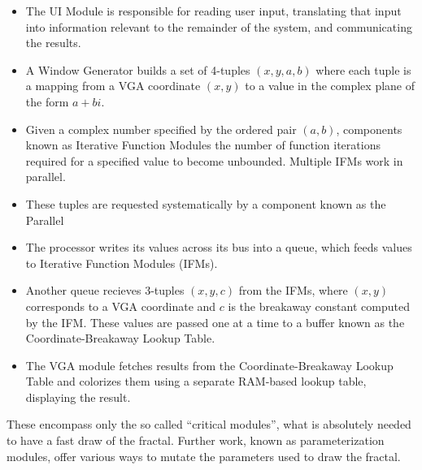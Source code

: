 \documentclass{article}
\begin{document}
\begin{itemize}
\item The UI Module is responsible for reading user input, translating that input
into information relevant to the remainder of the system, and communicating the results.
\item A Window Generator builds a set of 4-tuples $(x, y, a, b)$ where
  each tuple is a mapping from a VGA coordinate $(x, y)$ to a value in
  the complex plane of the form $a+bi$. 
\item Given a complex number specified by the ordered pair $(a, b)$, components known as
Iterative Function Modules
 the number of function iterations required for
  a specified value to become unbounded. Multiple IFMs work in
  parallel.

\item These tuples are requested systematically by a component known as the Parallel


\item The processor writes its values across its bus into a queue,
  which feeds values to Iterative Function Modules (IFMs).

\item Another queue recieves 3-tuples $(x, y, c)$ from the IFMs, where
  $(x, y)$ corresponds to a VGA coordinate and $c$ is the breakaway
  constant computed by the IFM. These values are passed one at a time
  to a buffer known as the Coordinate-Breakaway Lookup Table.
\item The VGA module fetches results from the Coordinate-Breakaway
  Lookup Table and colorizes them using a separate RAM-based lookup
  table, displaying the result.
\end{itemize}

These encompass only the so called ``critical modules'', what is
absolutely needed to have a fast draw of the fractal. Further work,
known as parameterization modules, offer various ways to mutate the
parameters used to draw the fractal.

\newpage
\end{document}
